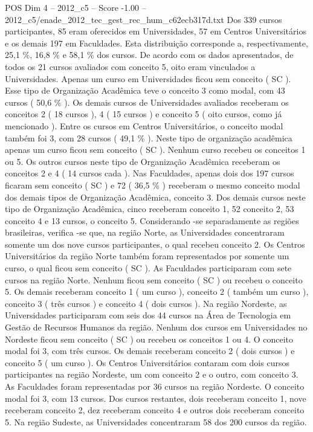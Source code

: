 \begin{textsample}{POS Dim 4 – 2012\_c5 – Score -1.00 – 2012\_c5/enade\_2012\_tec\_gest\_rec\_hum\_c62ecb317d.txt}
Dos 339 cursos participantes, 85 eram oferecidos em Universidades, 57 em Centros Universitários e os demais 197 em Faculdades.
Esta distribuição corresponde a, respectivamente, 25,1 \%, 16,8 \% e 58,1 \% dos cursos.
De acordo com os dados apresentados, de todos os 21 cursos avaliados com conceito 5, oito eram vinculados a Universidades.
Apenas um curso em Universidades ficou sem conceito ( SC ).
Esse tipo de Organização Acadêmica teve o conceito 3 como modal, com 43 cursos ( 50,6 \% ).
Os demais cursos de Universidades avaliados receberam os conceitos 2 ( 18 cursos ), 4 ( 15 cursos ) e conceito 5 ( oito cursos, como já mencionado ).
Entre os cursos em Centros Universitários, o conceito modal também foi 3, com 28 cursos ( 49,1 \% ).
Neste tipo de organização acadêmica apenas um curso ficou sem conceito ( SC ).
Nenhum curso recebeu os conceitos 1 ou 5.
Os outros cursos neste tipo de Organização Acadêmica receberam os conceitos 2 e 4 ( 14 cursos cada ).
Nas Faculdades, apenas dois dos 197 cursos ficaram sem conceito ( SC ) e 72 ( 36,5 \% ) receberam o mesmo conceito modal dos demais tipos de Organização Acadêmica, conceito 3.
Dos demais cursos neste tipo de Organização Acadêmica, cinco receberam conceito 1, 52 conceito 2, 53 conceito 4 e 13 cursos, o conceito 5.
Considerando -se separadamente as regiões brasileiras, verifica -se que, na região Norte, as Universidades concentraram somente um dos nove cursos participantes, o qual recebeu conceito 2.
Os Centros Universitários da região Norte também foram representados por somente um curso, o qual ficou sem conceito ( SC ).
As Faculdades participaram com sete cursos na região Norte.
Nenhum ficou sem conceito ( SC ) ou recebeu o conceito 5.
Os demais receberam conceito 1 ( um curso ), conceito 2 ( também um curso ), conceito 3 ( três cursos ) e conceito 4 ( dois cursos ).
Na região Nordeste, as Universidades participaram com seis dos 44 cursos na Área de Tecnologia em Gestão de Recursos Humanos da região.
Nenhum dos cursos em Universidades no Nordeste ficou sem conceito ( SC ) ou recebeu os conceitos 1 ou 4.
O conceito modal foi 3, com três cursos.
Os demais receberam conceito 2 ( dois cursos ) e conceito 5 ( um curso ).
Os Centros Universitários contaram com dois cursos participantes na região Nordeste, um com conceito 2 e o outro, com conceito 3.
As Faculdades foram representadas por 36 cursos na região Nordeste.
O conceito modal foi 3, com 13 cursos.
Dos cursos restantes, dois receberam conceito 1, nove receberam conceito 2, dez receberam conceito 4 e outros dois receberam conceito 5.
Na região Sudeste, as Universidades concentraram 58 dos 200 cursos da região.

\end{textsample}
